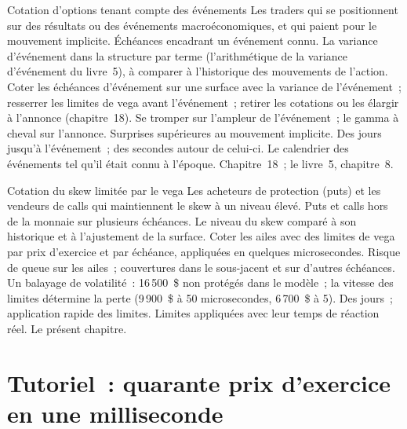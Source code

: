 \begin{strategyfile}{Cotation d'options tenant compte des événements}\label{strat:hf:automated-options-market-making:event}
 Les traders qui se positionnent sur des résultats ou des événements macroéconomiques, et qui paient pour le mouvement implicite.
 Échéances encadrant un événement connu.
 La variance d'événement dans la structure par terme (l'arithmétique de la variance d'événement du livre~5), à comparer à l'historique des mouvements de l'action.
 Coter les échéances d'événement sur une surface avec la variance de l'événement~; resserrer les limites de vega avant l'événement~; retirer les cotations ou les élargir à
l'annonce (chapitre~18).
 Se tromper sur l'ampleur de l'événement~; le gamma à cheval sur l'annonce.
 Surprises supérieures au mouvement implicite.
 Des jours jusqu'à l'événement~; des secondes autour de celui-ci.
 Le calendrier des événements tel qu'il était connu à l'époque.
 Chapitre~18~; le livre~5, chapitre~8.
\end{strategyfile}

\begin{strategyfile}{Cotation du skew limitée par le vega}\label{strat:hf:automated-options-market-making:vega}
 Les acheteurs de protection (puts) et les vendeurs de calls qui maintiennent le skew à un niveau élevé.
 Puts et calls hors de la monnaie sur plusieurs échéances.
 Le niveau du skew comparé à son historique et à l'ajustement de la surface.
 Coter les ailes avec des limites de vega par prix d'exercice et par échéance, appliquées en quelques microsecondes.
 Risque de queue sur les ailes~; couvertures dans le sous-jacent et sur d'autres échéances.
 Un balayage de volatilité~: 16\,500~\$ non protégés dans le modèle~; la vitesse des limites détermine la perte (9\,900~\$ à 50 microsecondes,
6\,700~\$ à 5).
 Des jours~; application rapide des limites.
 Limites appliquées avec leur temps de réaction réel.
 Le présent chapitre.
\end{strategyfile}

\section{Tutoriel~: quarante prix d'exercice en une milliseconde}\label{tut:hf:automated-options-market-making:tut}

